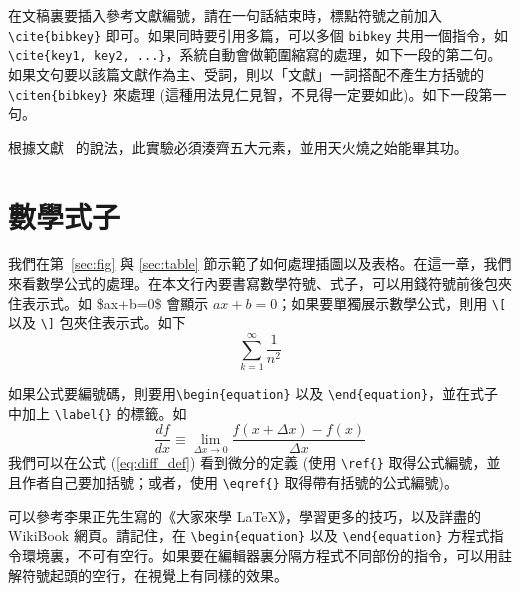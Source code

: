 在文稿裏要插入參考文獻編號，請在一句話結束時，標點符號之前加入 \verb+\cite{bibkey}+ 即可。如果同時要引用多篇，可以多個 \texttt{bibkey} 共用一個指令，如 \verb+\cite{key1, key2, ...}+，系統自動會做範圍縮寫的處理，如下一段的第二句。如果文句要以該篇文獻作為主、受詞，則以「文獻」一詞搭配不產生方括號的 \verb+\citen{bibkey}+ 來處理 (這種用法見仁見智，不見得一定要如此)。如下一段第一句。

根據文獻~ 的說法，此實驗必須湊齊五大元素\cite{jap_093_1108_2003_kondakov, ieee_ed_50_1830_2003_oriols, Chem.Mater._8_1365_1996_Papadimitrakopoulos, jap_079_2745_1996_scott, jap_087_8049_2000_adachi, jap_089_1704_2001_brutting, jap_089_4673_2001_popovic, synth.met._132_9_2002_nomura, cjk_book, thinfilm_macleod_2001,url_wiki_cv}，並用天火燒之始能畢其功。




\chapter{數學式子}

我們在第~\ref{sec:fig} 與 \ref{sec:table} 節示範了如何處理插圖以及表格。在這一章，我們來看數學公式的處理。在本文行內要書寫數學符號、式子，可以用錢符號前後包夾住表示式。如 \$ax+b=0\$ 會顯示 $ax+b=0$；如果要單獨展示數學公式，則用 \verb+\[+ 以及 \verb+\]+ 包夾住表示式。如下
\[
\sum_{k=1}^{\infty}\frac{1}{n^2}
\]

如果公式要編號碼，則要用\verb+\begin{equation}+ 以及 \verb+\end{equation}+，並在式子中加上 \verb+\label{}+ 的標籤。如
\begin{equation}
  \frac{df}{dx} \equiv \lim_{\Delta x \rightarrow 0} \frac{f(x+\Delta x) - f(x)}{\Delta x}   \label{eq:diff_def}
\end{equation}
我們可以在公式 (\ref{eq:diff_def}) 看到微分的定義 (使用 \verb+\ref{}+ 取得公式編號，並且作者自己要加括號；或者，使用 \verb+\eqref{}+ 取得帶有括號的公式編號)。

可以參考李果正先生寫的《大家來學 {\LaTeX}》，學習更多的技巧\cite{lee_latex123}，以及詳盡的 WikiBook 網頁\cite{url_latex_wikibook_math}。請記住，在 \verb+\begin{equation}+ 以及 \verb+\end{equation}+ 方程式指令環境裏，不可有空行。如果要在編輯器裏分隔方程式不同部份的指令，可以用註解符號起頭的空行，在視覺上有同樣的效果。

